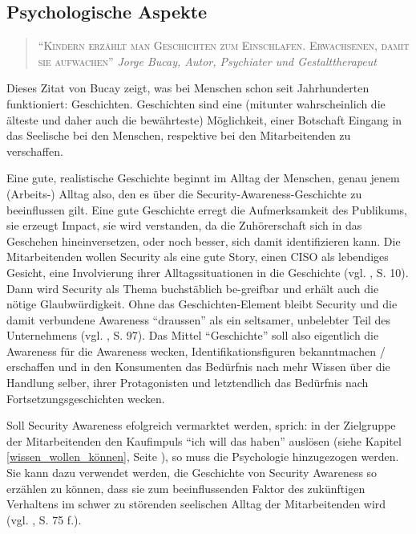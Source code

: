 \documentclass[../../main.tex]{subfiles}
\begin{document}
\newpage

\subsection{Psychologische Aspekte}

\begin{sloppypar}

\begin{quote}
\textsc{"`Kindern erzählt man Geschichten zum Einschlafen. Erwachsenen, damit sie aufwachen"'} \newline \newline \footnotesize{\textit{Jorge Bucay, Autor, Psychiater und Gestalttherapeut}}
\end{quote}

Dieses Zitat von Bucay zeigt, was bei Menschen schon seit Jahrhunderten funktioniert: Geschichten. Geschichten sind eine (mitunter wahrscheinlich die älteste und daher auch die bewährteste) Möglichkeit, einer Botschaft Eingang in das Seelische bei den Menschen, respektive bei den Mitarbeitenden zu verschaffen. 

Eine gute, realistische Geschichte beginnt im Alltag der Menschen, genau jenem (Arbeits-) Alltag also, den es über die Security-Awareness-Geschichte zu beeinflussen gilt. Eine gute Geschichte erregt die Aufmerksamkeit des Publikums, sie erzeugt Impact, sie wird verstanden, da die Zuhörerschaft sich in das Geschehen hineinversetzen, oder noch besser, sich damit identifizieren kann. Die Mitarbeitenden wollen Security als eine gute Story, einen CISO als lebendiges Gesicht, eine Involvierung ihrer Alltagssituationen in die Geschichte (vgl. \citeauthor{marchesi_security_2014} \citeyear{marchesi_security_2014}, S. 10). Dann wird Security als Thema buchstäblich be-greifbar und erhält auch die nötige Glaubwürdigkeit. Ohne das Geschichten-Element bleibt Security und die damit verbundene Awareness "`draussen"' als ein seltsamer, unbelebter Teil des Unternehmens (vgl. \citeauthor{helisch_security_2009} \citeyear{helisch_security_2009}, S. 97). Das Mittel "`Geschichte"' soll also eigentlich die Awareness für die Awareness wecken, Identifikationsfiguren bekanntmachen / erschaffen und in den Konsumenten das Bedürfnis nach mehr Wissen über die Handlung selber, ihrer Protagonisten und letztendlich das Bedürfnis nach Fortsetzungsgeschichten wecken.

Soll Security Awareness efolgreich vermarktet werden, sprich: in der Zielgruppe der Mitarbeitenden den Kaufimpuls "`ich will das haben"' auslösen (siehe Kapitel \ref{wissen_wollen_können}, Seite \pageref{wissen_wollen_können}), so muss die Psychologie hinzugezogen werden. Sie kann dazu verwendet werden, die Geschichte von Security Awareness so erzählen zu können, dass sie zum beeinflussenden Faktor des zukünftigen Verhaltens im schwer zu störenden seelischen Alltag der Mitarbeitenden wird (vgl. \citeauthor{helisch_security_2009} \citeyear{helisch_security_2009}, S. 75 f.).

\end{sloppypar}
\end{document}
